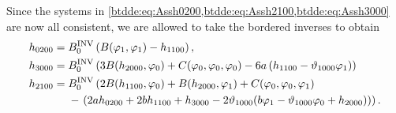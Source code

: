 Since the systems in \cref{btdde:eq:Assh0200,btdde:eq:Assh2100,btdde:eq:Assh3000} are now all consistent,
we are allowed to take the bordered inverses to obtain
\begin{align*}
h_{0200} ={}& B^{\mathrm{INV}}_{0} \left(B(\varphi_1,\varphi_1) - h_{1100}\right), \\
h_{3000} ={}& B^{\mathrm{INV}}_{0} \left(3 B(h_{2000},\varphi_0) + C(\varphi_0,\varphi_0,\varphi_0)
                 - 6a \left( h_{1100} - \vartheta_{1000} \varphi_1 \right)\right) \\
h_{2100} ={}& B^{\mathrm{INV}}_{0} \left(2 B(h_{1100},\varphi_0) + B(h_{2000},\varphi_1) + C(\varphi_0,\varphi_0,\varphi_1) \right. \\
                         & - \left.\left( 2 a h_{0200} + 2 b h_{1100} + h_{3000} 
                            - 2 \vartheta_{1000} (b\varphi_1 - \vartheta_{1000}\varphi_0 +h_{2000})\right)\right).
\end{align*}


